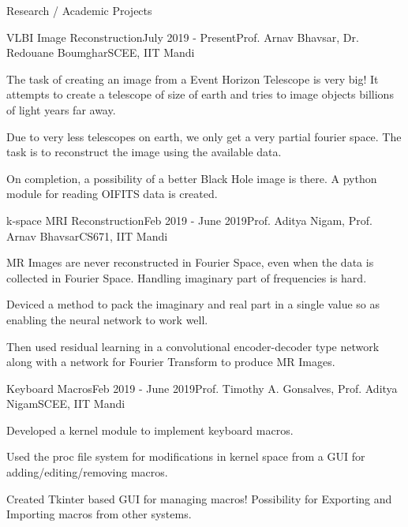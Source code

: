 \documentclass{resume} %
\begin{document}
\begin{rSection}{Research / Academic Projects}

\begin{rSubsection}{VLBI Image Reconstruction}{July 2019 - Present}{Prof. Arnav Bhavsar, Dr. Redouane Boumghar}{SCEE, IIT Mandi}
\item The task of creating an image from a Event Horizon Telescope  is very big! It attempts to create a telescope of size of earth and tries to image objects billions of light years far away.
\item  Due to very less telescopes on earth, we only get a very partial fourier space. The task is to reconstruct the image using the available data.  
\item On completion, a possibility of a better Black Hole image is there. A python module for reading OIFITS data is created.
 \end{rSubsection}

\begin{rSubsection}{k-space MRI Reconstruction}{Feb 2019 - June 2019}{Prof. Aditya Nigam, Prof. Arnav Bhavsar}{CS671, IIT Mandi}
\item MR Images are never reconstructed in Fourier Space, even when the data is collected in Fourier Space.  Handling imaginary part of frequencies is hard.
\item  Deviced a method to pack the imaginary and real part in a single value so as enabling the neural network to work well.
\item Then used residual learning in a convolutional encoder-decoder type network along with a network for Fourier Transform to produce MR Images.
 \end{rSubsection}
 
   \begin{rSubsection}{Keyboard Macros}{Feb 2019 - June 2019}{Prof. Timothy A. Gonsalves, Prof. Aditya Nigam}{SCEE, IIT Mandi}
\item Developed a kernel module to implement keyboard macros.
\item  Used the proc file system for modifications in kernel space from a GUI for adding/editing/removing macros.
\item Created Tkinter based GUI for managing macros! Possibility for Exporting and Importing macros from other systems.
 \end{rSubsection}
 

\end{rSection}
\end{document}
